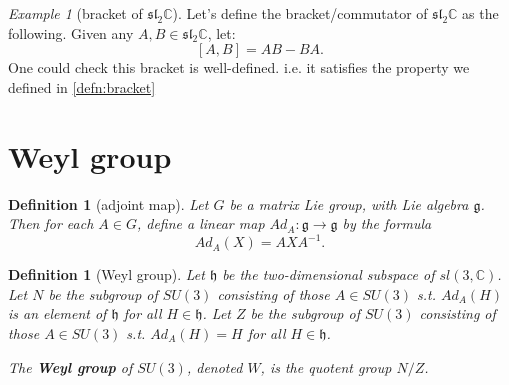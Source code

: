 \documentclass[a4paper]{article}
\newcommand{\C}{\mathbb{C}}
\theoremstyle{theorem} %
\theoremstyle{bfnote}                  %
\newtheorem{defn}[thm]{Definition}
\theoremstyle{example}                       %
\theoremstyle{remark}                       %
\newtheorem{exmp}[thm]{Example}  %
\numberwithin{equation}{section}
\begin{document}
\begin{exmp}[bracket of $\mathfrak{sl}_2\C$]
	Let's define the bracket/commutator of $\mathfrak{sl}_2\C$ as the following. Given any  $A, B \in \mathfrak{sl}_2\C$, let: \[
	\left[ A, B \right] = AB - BA. 
\] One could check this bracket is well-defined. i.e. it satisfies the property we defined in \ref{defn:bracket} 
\end{exmp}

\section{Weyl group}

\begin{defn}[adjoint map]	
	Let $G$ be a matrix Lie group, with Lie algebra  $\mathfrak{g}$. Then for each  $A \in G$, define a linear map $Ad_A: \mathfrak{g} \to  \mathfrak{g}$ by the formula \[
		Ad_A(X) = AXA^{-1}.
	\] 
\end{defn}

\begin{defn}[Weyl group]
	Let $\mathfrak{h}$ be the two-dimensional subspace of  $sl(3, \C)$. Let  $N$ be the subgroup of  $SU(3)$ consisting of those  $ A \in SU(3)$ s.t. $Ad_A(H)$ is an element of  $\mathfrak{h}$ for all  $H \in \mathfrak{h}$. Let $Z$ be the subgroup of  $SU(3)$ consisting of those  $A \in SU(3)$ s.t. $Ad_A(H)=H$ for all  $H \in \mathfrak{h}$.

	The \textbf{Weyl group} of $SU(3)$, denoted  $W$, is the quotent group  $N/Z$. 
\end{defn}



\nocite{*}

\newpage

\end{document}
